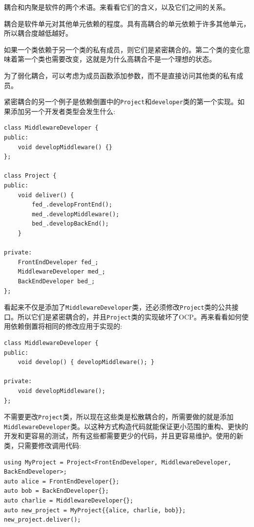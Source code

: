 
耦合和内聚是软件的两个术语。来看看它们的含义，以及它们之间的关系。



耦合是软件单元对其他单元依赖的程度。具有高耦合的单元依赖于许多其他单元，所以耦合度越低越好。

如果一个类依赖于另一个类的私有成员，则它们是紧密耦合的。第二个类的变化意味着第一个类也需要改变，这就是为什么高耦合不是一个理想的状态。

为了弱化耦合，可以考虑为成员函数添加参数，而不是直接访问其他类的私有成员。

紧密耦合的另一个例子是依赖倒置中的\texttt{Project}和\texttt{developer}类的第一个实现。如果添加另一个开发者类型会发生什么:


\begin{lstlisting}[style=styleCXX]
class MiddlewareDeveloper {
public:
	void developMiddleware() {}
};

class Project {
public:
	void deliver() {
		fed_.developFrontEnd();
		med_.developMiddleware();
		bed_.developBackEnd();
	}

private:
	FrontEndDeveloper fed_;
	MiddlewareDeveloper med_;
	BackEndDeveloper bed_;
};
\end{lstlisting}

看起来不仅是添加了\texttt{MiddlewareDeveloper}类，还必须修改\texttt{Project}类的公共接口。所以它们是紧密耦合的，并且\texttt{Project}类的实现破坏了OCP。再来看看如何使用依赖倒置将相同的修改应用于实现的:


\begin{lstlisting}[style=styleCXX]
class MiddlewareDeveloper {
public:
	void develop() { developMiddleware(); }
	
private:
	void developMiddleware();
};
\end{lstlisting}

不需要更改\texttt{Project}类，所以现在这些类是松散耦合的，所需要做的就是添加\texttt{MiddlewareDeveloper}类。以这种方式构造代码就能保证更小范围的重构、更快的开发和更容易的测试，所有这些都需要更少的代码，并且更容易维护。使用的新类，只需要修改调用代码:

\begin{lstlisting}[style=styleCXX]
using MyProject = Project<FrontEndDeveloper, MiddlewareDeveloper, BackEndDeveloper>;
auto alice = FrontEndDeveloper{};
auto bob = BackEndDeveloper{};
auto charlie = MiddlewareDeveloper{};
auto new_project = MyProject{{alice, charlie, bob}};
new_project.deliver();
\end{lstlisting}

